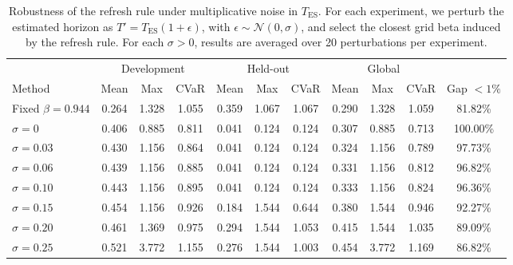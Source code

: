 \begin{table}[ht]
\centering
\small
\caption{Robustness of the refresh rule under multiplicative noise in \(T_{\mathrm{ES}}\). For each experiment, we perturb the estimated horizon as \(T'=T_{\mathrm{ES}}(1+\epsilon)\), with \(\epsilon\sim\mathcal{N}(0,\sigma)\), and select the closest grid beta induced by the refresh rule. For each \(\sigma>0\), results are averaged over 20 perturbations per experiment.}
\label{tab:refresh-noise-robustness}
\setlength{\tabcolsep}{5pt}
\begin{tabular*}{\textwidth}{@{\extracolsep{\fill}}lcccccccccc}
\toprule
& \multicolumn{3}{c}{Development} 
& \multicolumn{3}{c}{Held-out} 
& \multicolumn{3}{c}{Global}
& \\
\cmidrule(lr){2-4}
\cmidrule(lr){5-7}
\cmidrule(lr){8-10}
Method 
& Mean & Max & CVaR 
& Mean & Max & CVaR 
& Mean & Max & CVaR 
& Gap \(<1\%\) \\
\midrule
Fixed \(\beta=0.944\)
& 0.264 & 1.328 & 1.055
& 0.359 & 1.067 & 1.067
& 0.290 & 1.328 & 1.059
& 81.82\% \\

\(\sigma=0\)
& 0.406 & 0.885 & 0.811
& 0.041 & 0.124 & 0.124
& 0.307 & 0.885 & 0.713
& 100.00\% \\

\(\sigma=0.03\)
& 0.430 & 1.156 & 0.864
& 0.041 & 0.124 & 0.124
& 0.324 & 1.156 & 0.789
& 97.73\% \\

\(\sigma=0.06\)
& 0.439 & 1.156 & 0.885
& 0.041 & 0.124 & 0.124
& 0.331 & 1.156 & 0.812
& 96.82\% \\

\(\sigma=0.10\)
& 0.443 & 1.156 & 0.895
& 0.041 & 0.124 & 0.124
& 0.333 & 1.156 & 0.824
& 96.36\% \\

\(\sigma=0.15\)
& 0.454 & 1.156 & 0.926
& 0.184 & 1.544 & 0.644
& 0.380 & 1.544 & 0.946
& 92.27\% \\

\(\sigma=0.20\)
& 0.461 & 1.369 & 0.975
& 0.294 & 1.544 & 1.053
& 0.415 & 1.544 & 1.035
& 89.09\% \\

\(\sigma=0.25\)
& 0.521 & 3.772 & 1.155
& 0.276 & 1.544 & 1.003
& 0.454 & 3.772 & 1.169
& 86.82\% \\

\bottomrule
\end{tabular*}
\end{table}
